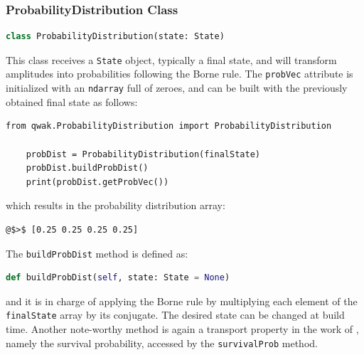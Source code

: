 \documentclass[main.tex]{subfiles}
\begin{document}
\subsubsection{ProbabilityDistribution Class}
\begin{lstlisting}[style=commands,language=Python,mathescape]
    class ProbabilityDistribution(state: State)
\end{lstlisting}
This class receives a \texttt{State} object, typically a final state, and will
transform amplitudes into probabilities following the Borne rule. The
\texttt{probVec} attribute is initialized with an \texttt{ndarray} full of
zeroes, and can be built with the previously obtained final state as follows:
\begin{lstlisting}[style=code,escapeinside={__}]
    from qwak.ProbabilityDistribution import ProbabilityDistribution 

    probDist = ProbabilityDistribution(finalState)
    probDist.buildProbDist()
    print(probDist.getProbVec())
\end{lstlisting}
which results in the probability distribution array:
\begin{lstlisting}[style=commands,mathescape]
@$>$ [0.25 0.25 0.25 0.25]
\end{lstlisting}\par

The \texttt{buildProbDist} method is defined as:
\begin{lstlisting}[style=commands,mathescape,language=Python]
    def buildProbDist(self, state: State = None)
\end{lstlisting}
and it is in charge of applying the Borne rule by multiplying each element of
the \texttt{finalState} array by its conjugate. The desired state can be
changed at build time. Another note-worthy method is again a transport property
in the work of \cite{buarqueAperiodic19}, namely the survival probability,
accessed by the \texttt{survivalProb} method. 
\end{document}
